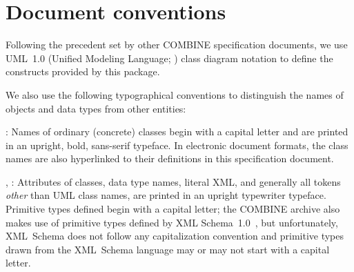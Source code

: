 \section{Document conventions} \label{conventions} 

Following the precedent set by other COMBINE specification
documents, we use UML~1.0 (Unified Modeling Language; 
\citet{eriksson:1998,oestereich:1999}) class diagram notation to 
define the constructs provided by this package. 

We also use the following typographical conventions to distinguish the 
names of objects and data types from other entities: 

\begin{description} 

\item {}: Names of ordinary (concrete) classes begin with a 
capital letter and are printed in an upright, bold, sans-serif typeface. 
In electronic document formats, the class names are also hyperlinked to 
their definitions in this specification document. 

\item {}, : Attributes of classes, data 
type names, literal XML, and generally all tokens \emph{other} than 
UML class names, are printed in an upright typewriter typeface. 
Primitive types defined begin with a capital letter; the COMBINE archive
also makes use of primitive types defined by XML 
Schema~1.0~\citep{biron:2000,fallside:2000,thompson:2000}, but 
unfortunately, XML~Schema does not follow any capitalization convention 
and primitive types drawn from the XML~Schema language may or may not 
start with a capital letter. 

\end{description} 
